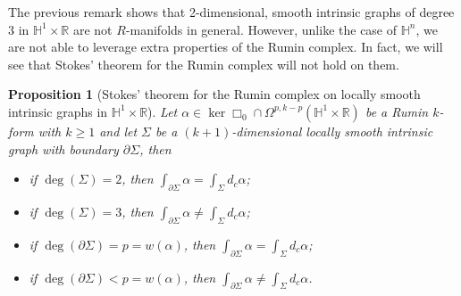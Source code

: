 \documentclass[dvipsnames]{amsart}
\newtheorem{proposition}[theorem]{Proposition}
\theoremstyle{definition}
\theoremstyle{definition}
\numberwithin{equation}{section}
\newcommand{\R}{\mathbb{R}}
\renewcommand{\H}{\mathbb{H}}
\begin{document}
The previous remark shows that 2-dimensional, smooth intrinsic graphs of degree 3 in $\H^1\times\R$ are not $R$-manifolds in general. However, unlike the case of $\H^n$, we are not able to leverage extra properties of the Rumin complex. In fact, we will see that Stokes' theorem for the Rumin complex will not hold on them.






\begin{proposition}[Stokes' theorem for the Rumin complex on locally smooth intrinsic graphs in $\H^1\times\R$]\label{prop: stokes intrinsic graphs H1timesR}
    Let $\alpha\in\ker\Box_0\cap\Omega^{p,k-p}(\H^1\times\R)$ be a Rumin $k$-form with $k\ge 1$ and let $\Sigma$ be a $(k+1)$-dimensional locally smooth intrinsic graph with boundary $\partial\Sigma$, then
    \begin{itemize}
        \item [$k=1$:] if $\operatorname{deg}(\Sigma)=2$, then $\int_{\partial\Sigma}\alpha=\int_\Sigma d_c\alpha$;
        \item [$k=1$:] if $\operatorname{deg}(\Sigma)=3$, then $\int_{\partial\Sigma}\alpha\neq\int_\Sigma d_c\alpha$;
        \item [$k=2$:] if $\operatorname{deg}(\partial\Sigma)=p=w(\alpha)$, then $\int_{\partial\Sigma}\alpha=\int_\Sigma d_c\alpha$;
        \item [$k=2$:] if $\operatorname{deg}(\partial\Sigma)<p=w(\alpha)$, then $\int_{\partial\Sigma}\alpha\neq\int_\Sigma d_c\alpha$.
        \end{itemize}
\end{proposition}
\end{document}
